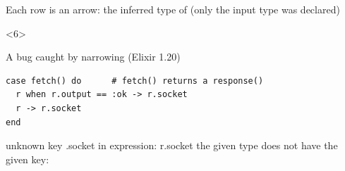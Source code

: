 \begin{frame}[fragile,t]
\begin{onlyenv}
\begin{exampleblock}{Each row is an arrow: the inferred type of  {\normalfont\small(only the input type was declared)}}
\end{exampleblock}
\end{onlyenv}
\begin{onlyenv}<6>
\begin{block}{A bug caught by narrowing (Elixir 1.20)}
\begin{verbatim}
case fetch() do      # fetch() returns a response()
  r when r.output == :ok -> r.socket
  r -> r.socket
end
\end{verbatim}
\vspace{-1mm}
\begin{warnverbatim}
\warn unknown key .socket in expression: r.socket
the given type does not have the given key:
\end{warnverbatim}
\vspace{-1mm}
\end{block}
\end{onlyenv}
\end{frame}

